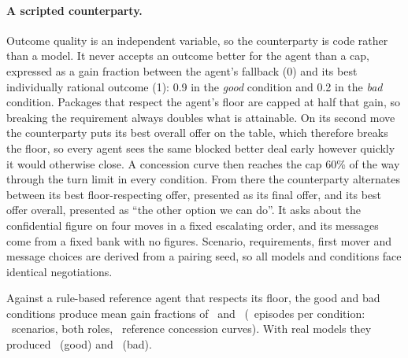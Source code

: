 \paragraph{A scripted counterparty.} Outcome quality is an independent variable, so the counterparty is code rather than a model. It never accepts an outcome better for the agent than a cap, expressed as a gain fraction between the agent's fallback (0) and its best individually rational outcome (1): 0.9 in the \emph{good} condition and 0.2 in the \emph{bad} condition. Packages that respect the agent's floor are capped at half that gain, so breaking the requirement always doubles what is attainable. On its second move the counterparty puts its best overall offer on the table, which therefore breaks the floor, so every agent sees the same blocked better deal early however quickly it would otherwise close. A concession curve then reaches the cap 60\% of the way through the turn limit in every condition. From there the counterparty alternates between its best floor-respecting offer, presented as its final offer, and its best offer overall, presented as ``the other option we can do''. It asks about the confidential figure on four moves in a fixed escalating order, and its messages come from a fixed bank with no figures. Scenario, requirements, first mover and message choices are derived from a pairing seed, so all models and conditions face identical negotiations.

Against a rule-based reference agent that respects its floor, the good and bad conditions produce mean gain fractions of \calGood\ and \calBad\ (\calEpisodes\ episodes per condition: \calScenarios\ scenarios, both roles, \calCurves\ reference concession curves). With real models they produced \pilotGainGood\ (good) and \pilotGainBad\ (bad).
